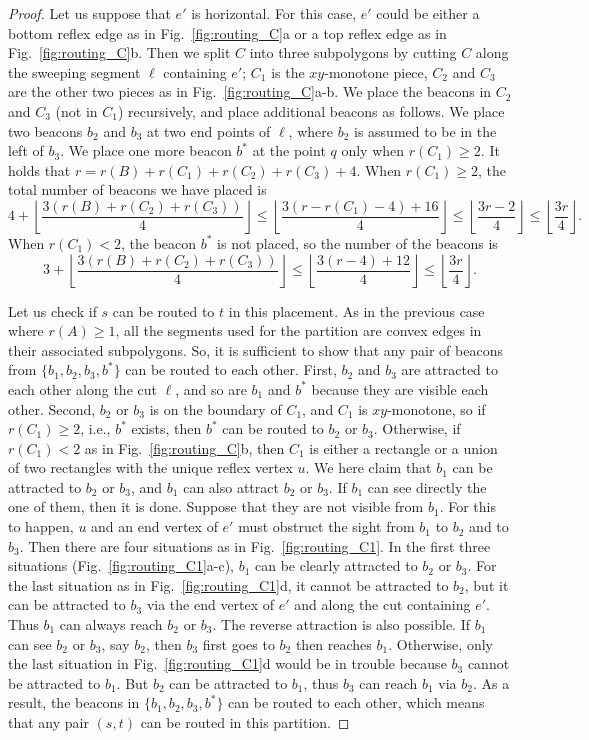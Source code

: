 \documentclass[11pt]{article}
\theoremstyle{definition}
\let\geq\geqslant
\let\leq\leqslant
\begin{document}
\begin{proof}
Let us suppose that $e'$ is horizontal. For this case, $e'$ could be either a bottom reflex edge as in Fig.~\ref{fig:routing_C}a or a top reflex edge as in Fig.~\ref{fig:routing_C}b. Then we split $C$ into three subpolygons by cutting $C$ along the sweeping segment $\ell$ containing $e'$; $C_1$ is the $xy$-monotone piece, $C_2$ and $C_3$ are the other two pieces as in Fig.~\ref{fig:routing_C}a-b. We place the beacons in $C_2$ and $C_3$ (not in $C_1$) recursively, and place additional beacons as follows. We place two beacons $b_2$ and $b_3$ at two end points of $\ell$, where $b_2$ is assumed to be in the left of $b_3$. We place one more beacon $b^*$ at the point $q$ only when $r(C_1)\geq 2$. It holds that $r = r(B)+r(C_1)+r(C_2)+r(C_3)+4$. When $r(C_1)\geq 2$, the total number of beacons we have placed is
\[ 4+\left\lfloor \frac{3(r(B)+r(C_2)+r(C_3))}{4}\right\rfloor \leq \left\lfloor \frac{3(r-r(C_1)-4)+16}{4}\right\rfloor \leq \left\lfloor \frac{3r-2}{4} \right\rfloor \leq \left\lfloor \frac{3r}{4} \right\rfloor.\]
When $r(C_1)<2$, the beacon $b^*$ is not placed, so the number of the beacons is
\[ 3+\left\lfloor \frac{3(r(B)+r(C_2)+r(C_3))}{4}\right\rfloor \leq \left\lfloor \frac{3(r-4)+12}{4}\right\rfloor \leq \left\lfloor \frac{3r}{4} \right\rfloor.\]

Let us check if $s$ can be routed to $t$ in this placement. As in the previous case where $r(A)\geq 1$, all the segments used for the partition are convex edges in their associated subpolygons. So, it is sufficient to show that any pair of beacons from $\{b_1, b_2, b_3, b^*\}$ can be routed to each other. First, $b_2$ and $b_3$ are attracted to each other along the cut $\ell$, and so are $b_1$ and $b^*$ because they are visible each other. Second, $b_2$ or $b_3$ is on the boundary of $C_1$, and $C_1$ is $xy$-monotone, so if $r(C_1)\geq 2$, i.e., $b^*$ exists, then $b^*$ can be routed to $b_2$ or $b_3$. Otherwise, if $r(C_1)<2$ as in Fig.~\ref{fig:routing_C}b, then $C_1$ is either a rectangle or a union of two rectangles with the unique reflex vertex $u$. We here claim that $b_1$ can be attracted to $b_2$ or $b_3$, and $b_1$ can also attract $b_2$ or $b_3$. If $b_1$ can see directly the one of them, then it is done. Suppose that they are not visible from $b_1$. For this to happen, $u$ and an end vertex of $e'$ must obstruct the sight from $b_1$ to $b_2$ and to $b_3$. Then there are four situations as in Fig.~\ref{fig:routing_C1}. In the first three situations (Fig.~\ref{fig:routing_C1}a-c), $b_1$ can be clearly attracted to $b_2$ or $b_3$. For the last situation as in Fig.~\ref{fig:routing_C1}d, it cannot be attracted to $b_2$, but it can be attracted to $b_3$ via the end vertex of $e'$ and along the cut containing $e'$. Thus $b_1$ can always reach $b_2$ or $b_3$. The reverse attraction is also possible. If $b_1$ can see $b_2$ or $b_3$, say $b_2$, then $b_3$ first goes to $b_2$ then reaches $b_1$. Otherwise, only the last situation in Fig.~\ref{fig:routing_C1}d would be in trouble because $b_3$ cannot be attracted to $b_1$. But $b_2$ can be attracted to $b_1$, thus $b_3$ can reach $b_1$ via $b_2$. As a result, the beacons in $\{b_1, b_2, b_3, b^*\}$ can be routed to each other, which means that any pair $(s, t)$ can be routed in this partition.


\end{proof}
\end{document}
